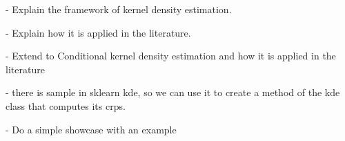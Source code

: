 - Explain the framework of kernel density estimation.

- Explain how it is applied in the literature.

- Extend to Conditional kernel density estimation
and how it is applied in the literature

- there is sample in sklearn kde, so we can use it to create a method of the kde class that computes its crps.

- Do a simple showcase with an example